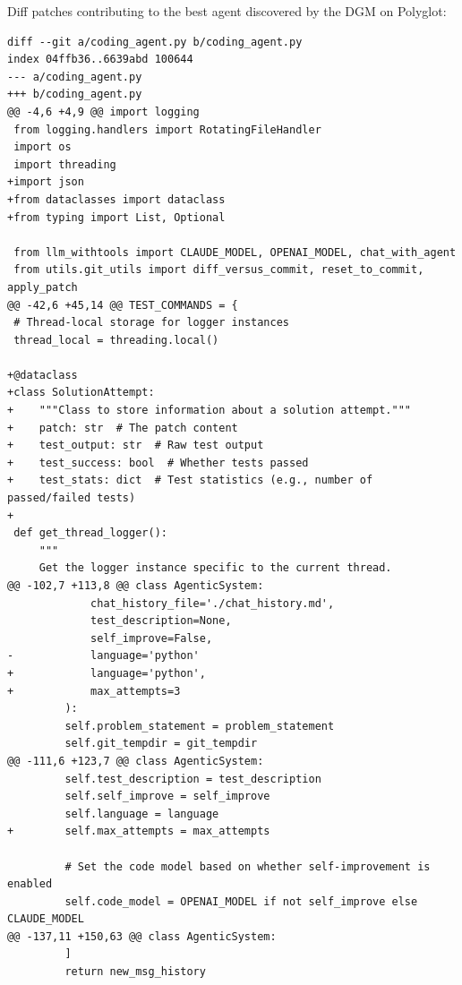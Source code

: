 \documentclass{article}
\begin{document}
Diff patches contributing to the best agent discovered by the DGM on Polyglot:

\begin{lstlisting}[style=diffstyle]
diff --git a/coding_agent.py b/coding_agent.py
index 04ffb36..6639abd 100644
--- a/coding_agent.py
+++ b/coding_agent.py
@@ -4,6 +4,9 @@ import logging
 from logging.handlers import RotatingFileHandler
 import os
 import threading
+import json
+from dataclasses import dataclass
+from typing import List, Optional
 
 from llm_withtools import CLAUDE_MODEL, OPENAI_MODEL, chat_with_agent
 from utils.git_utils import diff_versus_commit, reset_to_commit, apply_patch
@@ -42,6 +45,14 @@ TEST_COMMANDS = {
 # Thread-local storage for logger instances
 thread_local = threading.local()
 
+@dataclass
+class SolutionAttempt:
+    """Class to store information about a solution attempt."""
+    patch: str  # The patch content
+    test_output: str  # Raw test output
+    test_success: bool  # Whether tests passed
+    test_stats: dict  # Test statistics (e.g., number of passed/failed tests)
+
 def get_thread_logger():
     """
     Get the logger instance specific to the current thread.
@@ -102,7 +113,8 @@ class AgenticSystem:
             chat_history_file='./chat_history.md',
             test_description=None,
             self_improve=False,
-            language='python'
+            language='python',
+            max_attempts=3
         ):
         self.problem_statement = problem_statement
         self.git_tempdir = git_tempdir
@@ -111,6 +123,7 @@ class AgenticSystem:
         self.test_description = test_description
         self.self_improve = self_improve
         self.language = language
+        self.max_attempts = max_attempts
 
         # Set the code model based on whether self-improvement is enabled
         self.code_model = OPENAI_MODEL if not self_improve else CLAUDE_MODEL
@@ -137,11 +150,63 @@ class AgenticSystem:
         ]
         return new_msg_history
 

\end{lstlisting}
\end{document}

